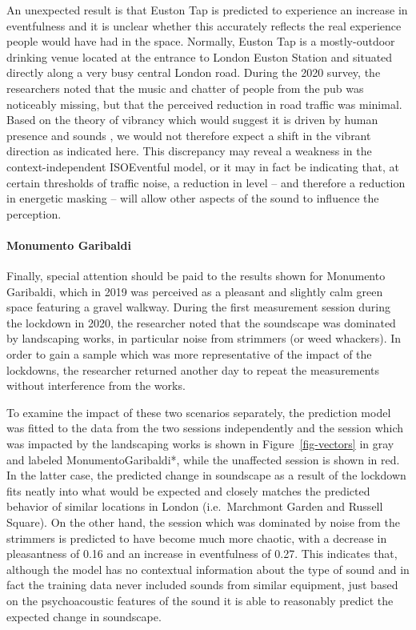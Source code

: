 \documentclass[
  authoryear,
  preprint,
  3p,
  onecolumn]{elsarticle}
\let\oldparagraph\paragraph
\renewcommand{\paragraph}[1]{\oldparagraph{#1}\mbox{}}
\begin{document}
An unexpected result is that Euston Tap is predicted to experience an
increase in eventfulness and it is unclear whether this accurately
reflects the real experience people would have had in the space.
Normally, Euston Tap is a mostly-outdoor drinking venue located at the
entrance to London Euston Station and situated directly along a very
busy central London road. During the 2020 survey, the researchers noted
that the music and chatter of people from the pub was noticeably
missing, but that the perceived reduction in road traffic was minimal.
Based on the theory of vibrancy which would suggest it is driven by
human presence and sounds \citep{Aletta2018Towards}, we would not
therefore expect a shift in the vibrant direction as indicated here.
This discrepancy may reveal a weakness in the context-independent
ISOEventful model, or it may in fact be indicating that, at certain
thresholds of traffic noise, a reduction in level -- and therefore a
reduction in energetic masking -- will allow other aspects of the sound
to influence the perception.

\hypertarget{monumento-garibaldi}{%
\paragraph{Monumento Garibaldi}\label{monumento-garibaldi}}

Finally, special attention should be paid to the results shown for
Monumento Garibaldi, which in 2019 was perceived as a pleasant and
slightly calm green space featuring a gravel walkway. During the first
measurement session during the lockdown in 2020, the researcher noted
that the soundscape was dominated by landscaping works, in particular
noise from strimmers (or weed whackers). In order to gain a sample which
was more representative of the impact of the lockdowns, the researcher
returned another day to repeat the measurements without interference
from the works.

To examine the impact of these two scenarios separately, the prediction
model was fitted to the data from the two sessions independently and the
session which was impacted by the landscaping works is shown in
Figure~\ref{fig-vectors} in gray and labeled MonumentoGaribaldi*, while
the unaffected session is shown in red. In the latter case, the
predicted change in soundscape as a result of the lockdown fits neatly
into what would be expected and closely matches the predicted behavior
of similar locations in London (i.e.~Marchmont Garden and Russell
Square). On the other hand, the session which was dominated by noise
from the strimmers is predicted to have become much more chaotic, with a
decrease in pleasantness of 0.16 and an increase in eventfulness of
0.27. This indicates that, although the model has no contextual
information about the type of sound and in fact the training data never
included sounds from similar equipment, just based on the psychoacoustic
features of the sound it is able to reasonably predict the expected
change in soundscape.
\end{document}
